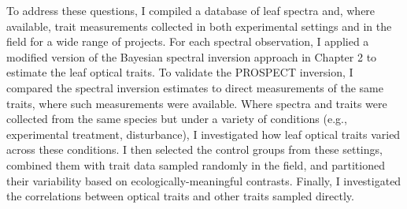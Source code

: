 To address these questions, I compiled a database of leaf spectra and, where available, trait measurements collected in both experimental settings and in the field for a wide range of projects.
For each spectral observation, I applied a modified version of the Bayesian spectral inversion approach in Chapter 2 to estimate the leaf optical traits.
To validate the PROSPECT inversion, I compared the spectral inversion estimates to direct measurements of the same traits, where such measurements were available.
Where spectra and traits were collected from the same species but under a variety of conditions (e.g., experimental treatment, disturbance), I investigated how leaf optical traits varied across these conditions.
I then selected the control groups from these settings, combined them with trait data sampled randomly in the field, and partitioned their variability based on ecologically-meaningful contrasts.
Finally, I investigated the correlations between optical traits and other traits sampled directly.
% 
% 
% 



